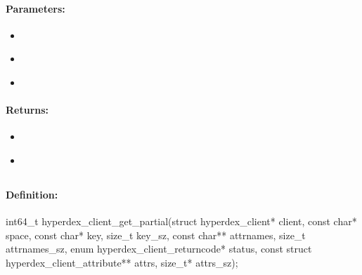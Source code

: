 \paragraph{Parameters:}
\begin{itemize}[noitemsep]
\item {}\\

\item {}\\

\item {}\\

\end{itemize}

\paragraph{Returns:}
\begin{itemize}[noitemsep]
\item {}\\

\item {}\\

\end{itemize}

\pagebreak
\subsection{}
\label{api:c:get_partial}


\paragraph{Definition:}
\begin{ccode}
int64_t hyperdex_client_get_partial(struct hyperdex_client* client,
        const char* space,
        const char* key, size_t key_sz,
        const char** attrnames, size_t attrnames_sz,
        enum hyperdex_client_returncode* status,
        const struct hyperdex_client_attribute** attrs, size_t* attrs_sz);
\end{ccode}

